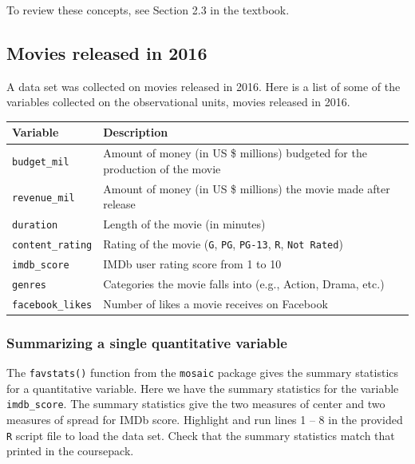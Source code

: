 \documentclass[
]{report}
\begin{document}
To review these concepts, see Section 2.3 in the textbook.

\hypertarget{movies-released-in-2016}{%
\subsection{Movies released in 2016}\label{movies-released-in-2016}}

A data set was collected on movies released in 2016. Here is a list of some of the variables collected on the observational units, movies released in 2016.

\begin{longtable}[]{@{}
  >{\raggedright\arraybackslash}p{}
  >{\raggedright\arraybackslash}p{}@{}}
\toprule
\textbf{Variable} & \textbf{Description} \\
\midrule
\endhead
\texttt{budget\_mil} & Amount of money (in US \$ millions) budgeted for the production of the movie \\
\texttt{revenue\_mil} & Amount of money (in US \$ millions) the movie made after release \\
\texttt{duration} & Length of the movie (in minutes) \\
\texttt{content\_rating} & Rating of the movie (\texttt{G}, \texttt{PG}, \texttt{PG-13}, \texttt{R}, \texttt{Not\ Rated}) \\
\texttt{imdb\_score} & IMDb user rating score from 1 to 10 \\
\texttt{genres} & Categories the movie falls into (e.g., Action, Drama, etc.) \\
\texttt{facebook\_likes} & Number of likes a movie receives on Facebook \\
\bottomrule
\end{longtable}

\newpage

\hypertarget{summarizing-a-single-quantitative-variable}{%
\subsubsection*{Summarizing a single quantitative variable}\label{summarizing-a-single-quantitative-variable}}

The \texttt{favstats()} function from the \texttt{mosaic} package gives the summary statistics for a quantitative variable. Here we have the summary statistics for the variable \texttt{imdb\_score}. The summary statistics give the two measures of center and two measures of spread for IMDb score. Highlight and run lines 1 -- 8 in the provided \texttt{R} script file to load the data set. Check that the summary statistics match that printed in the coursepack.
\end{document}
